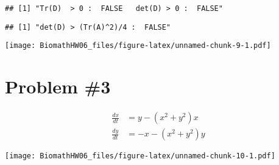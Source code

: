 \documentclass[]{article}
\begin{document}
\begin{verbatim}
## [1] "Tr(D)  > 0 :  FALSE   det(D) > 0 :  FALSE"
\end{verbatim}

\begin{verbatim}
## [1] "det(D) > (Tr(A)^2)/4 :  FALSE"
\end{verbatim}

\texttt{[image: BiomathHW06\_files/figure-latex/unnamed-chunk-9-1.pdf]}

\section{Problem \#3}\label{problem-3}

\[
\begin{aligned}
\frac{dx}{dt} &= y-(x^2+y^2)x \\
\frac{dy}{dt} &= -x-(x^2+y^2)y
\end{aligned}
\]

\texttt{[image: BiomathHW06\_files/figure-latex/unnamed-chunk-10-1.pdf]}
\end{document}
